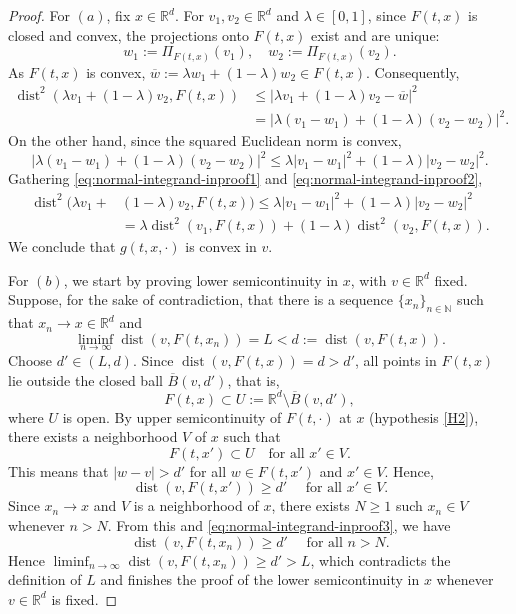 \documentclass[11pt]{elsarticle}
\theoremstyle{definition}
\theoremstyle{remark}
\numberwithin{equation}{section}
\def\dist{\operatorname{dist}}
\begin{document}
	\begin{proof}
		For $(a)$,
		fix $x \in \mathbb{R}^d$. For $v_1, v_2 \in \mathbb{R}^d$ and $\lambda \in [0,1]$, 
		since $F(t,x)$ is closed and convex, the projections onto $F(t,x)$ exist and are unique:
		\[
		w_1 := \Pi_{F(t,x)} (v_1),  \quad
		w_2 := \Pi_{F(t,x)} (v_2).
		\]
		As $F(t,x)$ is convex, $\overline{w} := \lambda w_1 + (1-\lambda) w_2 \in F(t,x)$. Consequently,
		\begin{align}\label{eq:normal-integrand-inproof1}
			\dist^2(\lambda v_1 + (1-\lambda)v_2, F(t,x)) 
			& \le \big|\lambda v_1 + (1-\lambda)v_2 - \overline{w}\big|^2 
			\nonumber\\ & 
			= \left|\lambda(v_1 - w_1) + (1-\lambda)(v_2 - w_2)\right|^2.
		\end{align}
		On the other hand, since the squared Euclidean norm is convex,
		\begin{equation}\label{eq:normal-integrand-inproof2}
			|\lambda(v_1 - w_1) + (1-\lambda)(v_2 - w_2)|^2 
			\le \lambda |v_1 - w_1|^2 + (1-\lambda) |v_2 - w_2|^2.
		\end{equation}
		Gathering \eqref{eq:normal-integrand-inproof1} and \eqref{eq:normal-integrand-inproof2},
		\begin{align*}
			\dist^2(\lambda v_1 + & (1-\lambda)v_2, F(t,x)) 
			\le \lambda |v_1 - w_1|^2 + (1-\lambda)|v_2 - w_2|^2 
			\\ &
			= \lambda \dist^2(v_1, F(t,x)) + (1-\lambda) \dist^2(v_2, F(t,x)).
		\end{align*}
		We conclude that $g(t, x, \cdot)$ is convex in $v$.
		
		For $(b)$,
		we start by proving lower semicontinuity in $x$, with $v\in \mathbb{R}^d$ fixed.
		Suppose, for the sake of contradiction, that there is a sequence $\{x_n\}_{n\in\mathbb{N}}$ such that $x_n \to x \in \mathbb{R}^d$ and 
		\[
		\liminf_{n \to \infty} \dist(v, F(t, x_n)) = L < d := \dist(v, F(t, x)).
		\]
		Choose $d' \in (L, d)$. Since $\dist(v, F(t,x)) = d > d'$, all points in $F(t,x)$ 
		lie outside the closed ball $\overline{B}(v, d')$, that is,
		\[
		F(t, x) \subset U := \mathbb{R}^d \setminus \overline{B}(v, d'),
		\]
		where $U$ is open.
		By upper semicontinuity of $F(t, \cdot)$ at $x$ (hypothesis \ref{H2}), 
		there exists a neighborhood $V$ of $x$ such that
		\[
		F(t, x') \subset U \quad \text{for all } x' \in V.
		\]
		This means that $|w - v| > d'$ for all $w \in F(t, x')$ and $x'\in V$. Hence,
		\begin{equation}\label{eq:normal-integrand-inproof3}
			\dist(v, F(t, x')) \ge d' \quad \text{ for all } x'\in V.
		\end{equation}
		Since $x_n \to x$ and $V$ is a neighborhood of $x$, there exists $N\geq 1$ such $x_n \in V$ whenever $n > N$. From this and \eqref{eq:normal-integrand-inproof3}, we have
		\[
		\dist(v, F(t, x_n)) \ge d' \quad \text{ for all } n > N.
		\]
		Hence $\liminf_{n\to\infty}\dist(v, F(t, x_n))\ge d' > L$, which contradicts the definition of $L$ and finishes the proof of the lower semicontinuity in $x$ whenever $v\in\mathbb{R}^d$ is fixed.
		

\end{proof}
\end{document}
